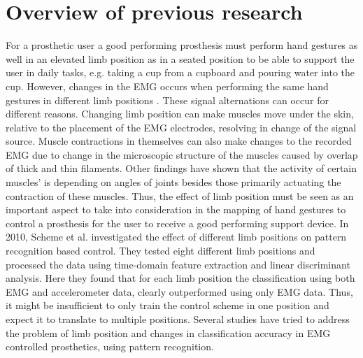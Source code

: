 \section{Overview of previous research}

For a prosthetic user a good performing prosthesis must perform hand gestures as well in an elevated limb position as in a seated position to be able to support the user in daily tasks, e.g. taking a cup from a cupboard and pouring water into the cup. However, changes in the EMG occurs when performing the same hand gestures in different limb positions \cite{Fougner2011, avella2006}. These signal alternations can occur for different reasons. Changing limb position can make muscles move under the skin, relative to the placement of the EMG electrodes, resolving in change of the signal source. Muscle contractions in themselves can also make changes to the recorded EMG due to change in the microscopic structure of the muscles caused by overlap of thick and thin filaments. \cite{martini}  
Other findings have shown that the activity of certain muscles' is depending on angles of joints besides those primarily actuating the contraction of these muscles. \cite{Fougner2011} Thus, the effect of limb position must be seen as an important aspect to take into consideration in the mapping of hand gestures to control a prosthesis for the user to receive a good performing support device. %
In 2010, Scheme et al. investigated the effect of different limb positions on pattern recognition based control. They tested eight different limb positions and processed the data using time-domain feature extraction and linear discriminant analysis. Here they found that for each limb position the classification using both EMG and accelerometer data, clearly outperformed using only EMG data. Thus, it might be insufficient to only train the control scheme in one position and expect it to translate to multiple positions. \cite{Fougner2010} 
Several studies have tried to address the problem of limb position and changes in classification accuracy in EMG controlled prosthetics, using pattern recognition. %

